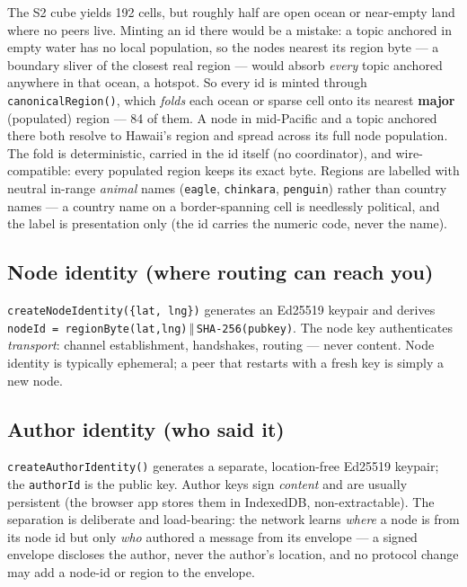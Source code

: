 \documentclass[nobib]{tufte-handout}
\begin{document}
The S2 cube yields 192 cells, but roughly half are open ocean or near-empty
land where no peers live. Minting an id there would be a mistake: a topic
anchored in empty water has no local population, so the nodes nearest its
region byte --- a boundary sliver of the closest real region --- would absorb
\emph{every} topic anchored anywhere in that ocean, a hotspot. So every id is
minted through \texttt{canonicalRegion()}, which \emph{folds} each ocean or
sparse cell onto its nearest \textbf{major} (populated) region --- 84 of them.
A node in mid-Pacific and a topic anchored there both resolve to Hawaii's
region and spread across its full node population. The fold is deterministic,
carried in the id itself (no coordinator), and wire-compatible: every populated
region keeps its exact byte. Regions are labelled with neutral in-range
\emph{animal} names (\texttt{eagle}, \texttt{chinkara}, \texttt{penguin})
rather than country names --- a country name on a border-spanning cell is
needlessly political, and the label is presentation only (the id carries the
numeric code, never the name).

\subsection{Node identity (where routing can reach you)}

\texttt{createNodeIdentity(\{lat, lng\})} generates an Ed25519 keypair
and derives \texttt{nodeId = regionByte(lat,lng)}\,$\Vert$\,\texttt{SHA-256(pubkey)}.
The node key authenticates \emph{transport}: channel establishment,
handshakes, routing --- never content. Node identity is typically
ephemeral; a peer that restarts with a fresh key is simply a new node.

\subsection{Author identity (who said it)}

\texttt{createAuthorIdentity()} generates a separate, location-free
Ed25519 keypair; the \texttt{authorId} is the public key. Author keys
sign \emph{content} and are usually persistent (the browser app stores
them in IndexedDB, non-extractable). The separation is deliberate and
load-bearing: the network learns \emph{where} a node is from its node id
but only \emph{who} authored a message from its envelope --- a signed
envelope discloses the author, never the author's location, and no
protocol change may add a node-id or region to the envelope.
\end{document}
